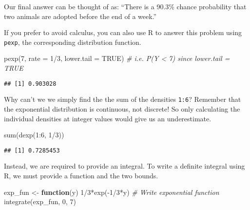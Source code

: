 \documentclass[
]{article}
\newenvironment{Shaded}{\begin{snugshade}}{\end{snugshade}}
\newcommand{\AttributeTok}[1]{\textcolor[rgb]{0.77,0.63,0.00}{#1}}
\newcommand{\CommentTok}[1]{\textcolor[rgb]{0.56,0.35,0.01}{\textit{#1}}}
\newcommand{\ConstantTok}[1]{\textcolor[rgb]{0.00,0.00,0.00}{#1}}
\newcommand{\ControlFlowTok}[1]{\textcolor[rgb]{0.13,0.29,0.53}{\textbf{#1}}}
\newcommand{\DecValTok}[1]{\textcolor[rgb]{0.00,0.00,0.81}{#1}}
\newcommand{\FunctionTok}[1]{\textcolor[rgb]{0.00,0.00,0.00}{#1}}
\newcommand{\NormalTok}[1]{#1}
\newcommand{\OtherTok}[1]{\textcolor[rgb]{0.56,0.35,0.01}{#1}}
\newcommand{\SpecialCharTok}[1]{\textcolor[rgb]{0.00,0.00,0.00}{#1}}
\begin{document}
Our final answer can be thought of as: ``There is a 90.3\% chance probability that two animals are adopted before the end of a week.''

If you prefer to avoid calculus, you can also use R to answer this problem using \texttt{pexp}, the corresponding distribution function.

\begin{Shaded}
\begin{Highlighting}[]
\FunctionTok{pexp}\NormalTok{(}\DecValTok{7}\NormalTok{, }\AttributeTok{rate =} \DecValTok{1}\SpecialCharTok{/}\DecValTok{3}\NormalTok{, }\AttributeTok{lower.tail =} \ConstantTok{TRUE}\NormalTok{) }\CommentTok{\# i.e. P(Y \textless{} 7) since lower.tail = TRUE}
\end{Highlighting}
\end{Shaded}

\begin{verbatim}
## [1] 0.903028
\end{verbatim}

Why can't we we simply find the the sum of the densities \texttt{1:6}? Remember that the exponential distribution is continuous, not discrete! So only calculating the individual densities at integer values would give us an underestimate.

\begin{Shaded}
\begin{Highlighting}[]
\FunctionTok{sum}\NormalTok{(}\FunctionTok{dexp}\NormalTok{(}\DecValTok{1}\SpecialCharTok{:}\DecValTok{6}\NormalTok{, }\DecValTok{1}\SpecialCharTok{/}\DecValTok{3}\NormalTok{))}
\end{Highlighting}
\end{Shaded}

\begin{verbatim}
## [1] 0.7285453
\end{verbatim}

Instead, we are required to provide an integral. To write a definite integral using R, we must provide a function and the two bounds.

\begin{Shaded}
\begin{Highlighting}[]
\NormalTok{exp\_fun }\OtherTok{\textless{}{-}} \ControlFlowTok{function}\NormalTok{(y) }\DecValTok{1}\SpecialCharTok{/}\DecValTok{3}\SpecialCharTok{*}\FunctionTok{exp}\NormalTok{(}\SpecialCharTok{{-}}\DecValTok{1}\SpecialCharTok{/}\DecValTok{3}\SpecialCharTok{*}\NormalTok{y) }\CommentTok{\# Write exponential function}
\FunctionTok{integrate}\NormalTok{(exp\_fun, }\DecValTok{0}\NormalTok{, }\DecValTok{7}\NormalTok{)}
\end{Highlighting}
\end{Shaded}
\end{document}
